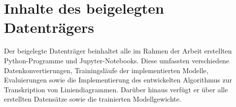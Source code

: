 
\chapter{Inhalte des beigelegten Datenträgers}

Der beigelegte Datenträger beinhaltet alle im Rahmen der Arbeit erstellten Python-Programme und Jupyter-Notebooks. Diese umfassten verschiedene Datenkonvertierungen, Trainingsläufe der implementierten Modelle, Evaluierungen sowie die Implementierung des entwickelten Algorithmus zur Transkription von Liniendiagrammen. Darüber hinaus verfügt er über alle erstellten Datensätze sowie die trainierten Modellgewichte.

